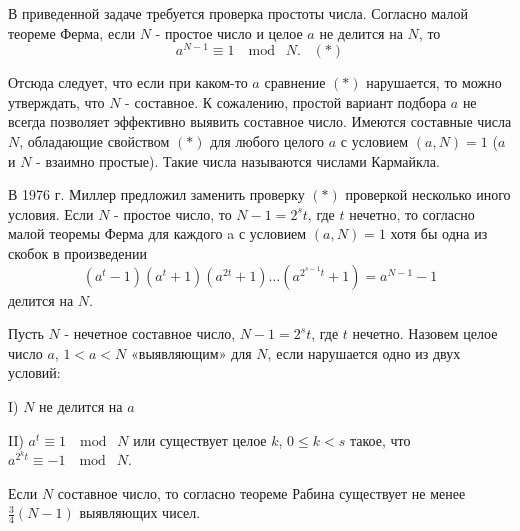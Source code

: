 \begin{remark}
В приведенной задаче требуется проверка простоты числа. Согласно малой теореме Ферма, если $N$ - простое число и целое $a$ не делится на $N$, то  
\[a^{N-1} \equiv 1\; \mod\; N.                         \; \; \;            \left(*\right)\] 

Отсюда следует, что если при каком-то $a$ сравнение $\left(*\right)$ нарушается, то можно утверждать, что $N$ - составное. 
К сожалению,  простой вариант подбора $a$ не всегда позволяет эффективно выявить составное число. Имеются составные числа $N$, обладающие свойством $\left(*\right)$ для любого целого $a$ с условием $\left(a,N\right)=1$ ($a$ и $N$ - взаимно простые). Такие числа называются числами Кармайкла.

В 1976 г. Миллер предложил заменить проверку $\left(*\right)$ проверкой несколько иного условия. Если $N$ - простое число, то $N-1=2^{s} t$, где $t$ нечетно, то согласно малой теоремы Ферма для каждого a с условием $\left(a,N\right)=1$ хотя бы одна из скобок в произведении 
\[\left(a^{t} -1\right)\left(a^{t} +1\right)\left(a^{2t} +1\right) \ldots  \left(a^{2^{s-1} t} +1\right)=a^{N-1} -1\] 
делится на $N$. 

Пусть $N$ - нечетное составное число, $N-1=2^{s} t$, где \textbf{$t$ }нечетно. Назовем целое число $a$, $1<a<N$ «выявляющим» для $N$, если нарушается одно из двух условий:

I) $N$ не делится на $a$

II) $a^{t} \equiv 1\; \mod\; N$ или существует целое $k$, $0\le k<s$ такое, что $a^{2^{k} t} \equiv -1\; \mod\; N$.

Если $N$ составное число, то согласно теореме Рабина  существует не менее $\frac{3}{4} \left(N-1\right)$  выявляющих чисел.

\end{remark}

